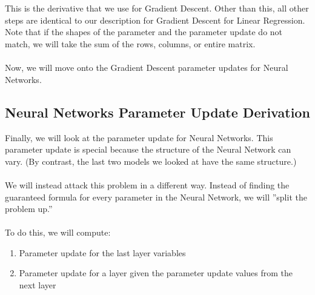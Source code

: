 \documentclass{article}
\begin{document}
\\
\\
This is the derivative that we use for Gradient Descent. Other than this, all other steps are identical to our description for Gradient Descent for Linear Regression. Note that if the shapes of the parameter and the parameter update do not match, we will take the sum of the rows, columns, or entire matrix. 
\\
\\
Now, we will move onto the Gradient Descent parameter updates for Neural Networks.

\subsection{Neural Networks Parameter Update Derivation}
Finally, we will look at the parameter update for Neural Networks. This parameter update is special because the structure of the Neural Network can vary. (By contrast, the last two models we looked at have the same structure.)
\\
\\
We will instead attack this problem in a different way. Instead of finding the guaranteed formula for every parameter in the Neural Network, we will ''split the problem up.''
\\
\\
To do this, we will compute:
\begin{enumerate}
    \item Parameter update for the last layer variables
    \item Parameter update for a layer given the parameter update values from the next layer
\end{enumerate}
\end{document}
